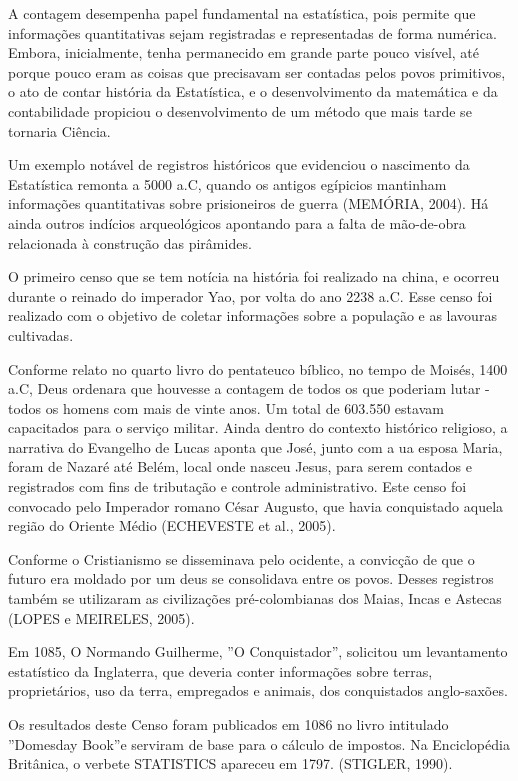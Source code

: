 \documentclass[
  letterpaper,
  DIV=11,
  numbers=noendperiod]{scrreprt}
\begin{document}
A contagem desempenha papel fundamental na estatística, pois permite que
informações quantitativas sejam registradas e representadas de forma
numérica. Embora, inicialmente, tenha permanecido em grande parte pouco
visível, até porque pouco eram as coisas que precisavam ser contadas
pelos povos primitivos, o ato de contar história da Estatística, e o
desenvolvimento da matemática e da contabilidade propiciou o
desenvolvimento de um método que mais tarde se tornaria Ciência.

Um exemplo notável de registros históricos que evidenciou o nascimento
da Estatística remonta a 5000 a.C, quando os antigos egípicios mantinham
informações quantitativas sobre prisioneiros de guerra (MEMÓRIA, 2004).
Há ainda outros indícios arqueológicos apontando para a falta de
mão-de-obra relacionada à construção das pirâmides.

O primeiro censo que se tem notícia na história foi realizado na china,
e ocorreu durante o reinado do imperador Yao, por volta do ano 2238 a.C.
Esse censo foi realizado com o objetivo de coletar informações sobre a
população e as lavouras cultivadas.

Conforme relato no quarto livro do pentateuco bíblico, no tempo de
Moisés, 1400 a.C, Deus ordenara que houvesse a contagem de todos os que
poderiam lutar - todos os homens com mais de vinte anos. Um total de
603.550 estavam capacitados para o serviço militar. Ainda dentro do
contexto histórico religioso, a narrativa do Evangelho de Lucas aponta
que José, junto com a ua esposa Maria, foram de Nazaré até Belém, local
onde nasceu Jesus, para serem contados e registrados com fins de
tributação e controle administrativo. Este censo foi convocado pelo
Imperador romano César Augusto, que havia conquistado aquela região do
Oriente Médio (ECHEVESTE et al., 2005).

Conforme o Cristianismo se disseminava pelo ocidente, a convicção de que
o futuro era moldado por um deus se consolidava entre os povos. Desses
registros também se utilizaram as civilizações pré-colombianas dos
Maias, Incas e Astecas (LOPES e MEIRELES, 2005).

Em 1085, O Normando Guilherme, ''O Conquistador'', solicitou um
levantamento estatístico da Inglaterra, que deveria conter informações
sobre terras, proprietários, uso da terra, empregados e animais, dos
conquistados anglo-saxões.

Os resultados deste Censo foram publicados em 1086 no livro intitulado
''Domesday Book''e serviram de base para o cálculo de impostos. Na
Enciclopédia Britânica, o verbete STATISTICS apareceu em 1797. (STIGLER,
1990).
\end{document}
